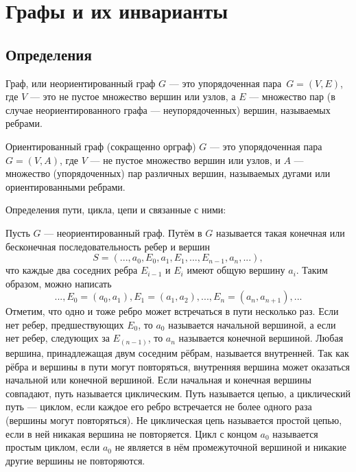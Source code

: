 \chapter{Графы и их инварианты}

\section{Определения}

\begin{my_def}
Граф, или неориентированный граф $G$ --- это упорядоченная пара~$G=(V,E)$,
где $V$ --- это не пустое множество вершин или узлов, а $E$ --- множество пар
(в случае неориентированного графа — неупорядоченных) вершин, называемых ребрами.
\end{my_def}

\begin{my_def}
Ориентированный граф (сокращенно орграф)  $G$ --- это упорядоченная пара~$G=(V,A)$,
где  $V$ — не пустое множество вершин или узлов, и  $A$ — множество (упорядоченных)
пар различных вершин, называемых дугами или ориентированными ребрами.
\end{my_def}

Определения пути, цикла, цепи и связанные с ними:

\begin{my_def}
Пусть $G$ --- неориентированный граф. Путём в $G$ называется такая конечная или
бесконечная последовательность ребер и вершин
$$S = (..., a_0,E_0, a_1, E_1, ..., E_{n-1}, a_n, ...),$$
что каждые два соседних ребра  $E_{i-1}$ и  $E_{i}$ имеют общую вершину  $a_{i}$.
Таким образом, можно написать
$$..., E_0=(a_0,a_1), E_1=(a_1,a_2), ... , E_n=(a_n,a_{n+1}), ...$$
Отметим, что одно и тоже ребро может встречаться в пути несколько раз. Если нет ребер,
предшествующих  $E_{0}$, то  $a_{0}$ называется начальной вершиной, а если нет
ребер, следующих за  $E_{(n-1)}$, то  $a_n$ называется конечной вершиной.
Любая вершина, принадлежащая двум соседним рёбрам, называется внутренней.
Так как рёбра и вершины в пути могут повторяться, внутренняя вершина может оказаться
начальной или конечной вершиной. Если начальная и конечная вершины совпадают,
путь называется циклическим. Путь называется цепью, а циклический путь — циклом,
если каждое его ребро встречается не более одного раза (вершины могут повторяться).
Не циклическая цепь называется простой цепью, если в ней никакая вершина не повторяется.
Цикл с концом  $a_{0}$ называется простым циклом, если  $a_{0}$ не является в нём
промежуточной вершиной и никакие другие вершины не повторяются.
\end{my_def}

